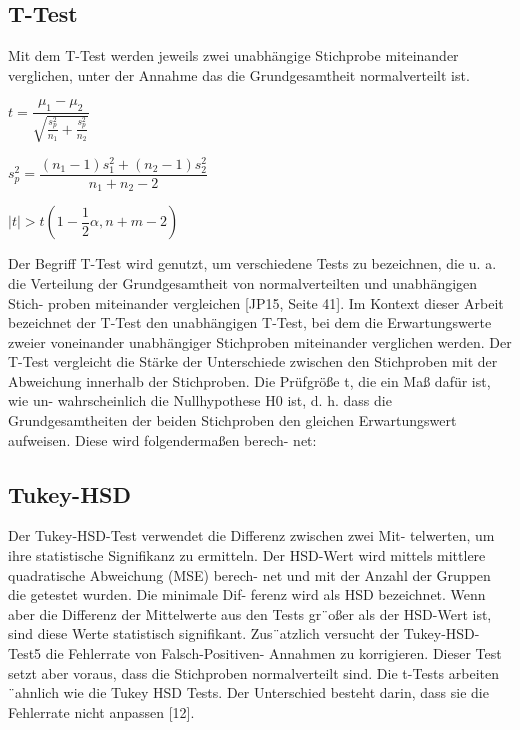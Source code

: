 \subsection{T-Test}
Mit dem T-Test werden jeweils zwei unabhängige Stichprobe miteinander verglichen, 
unter der Annahme das die Grundgesamtheit normalverteilt ist.

\begin{center}
  $t = \dfrac{\mu_1-\mu_2}{\sqrt{\frac{s_p^2}{n_1} + \frac{s_p^2}{n_2}}}$
\end{center}

\begin{center}
  $s^2_p = \dfrac{(n_1 - 1)s^2_1 + (n_2 - 1)s^2_2}{n_1 + n_2 - 2}$
\end{center}

\begin{center}
  $|t| > t(1 - \dfrac{1}{2}\alpha, n + m - 2)$
\end{center}

Der Begriff T-Test wird genutzt, um verschiedene Tests zu bezeichnen, die
u. a. die Verteilung der Grundgesamtheit von normalverteilten und unabhängigen Stich-
proben miteinander vergleichen [JP15, Seite 41]. Im Kontext dieser Arbeit bezeichnet
der T-Test den unabhängigen T-Test, bei dem die Erwartungswerte zweier voneinander
unabhängiger Stichproben miteinander verglichen werden.
Der T-Test vergleicht die Stärke der Unterschiede zwischen den Stichproben mit der
Abweichung innerhalb der Stichproben. Die Prüfgröße t, die ein Maß dafür ist, wie un-
wahrscheinlich die Nullhypothese H0 ist, d. h. dass die Grundgesamtheiten der beiden
Stichproben den gleichen Erwartungswert aufweisen. Diese wird folgendermaßen berech-
net:
\subsection{Tukey-HSD}
Der Tukey-HSD-Test verwendet die Differenz zwischen zwei Mit-
telwerten, um ihre statistische Signifikanz zu ermitteln.
Der HSD-Wert wird mittels mittlere quadratische Abweichung (MSE) berech-
net und mit der Anzahl der Gruppen die getestet wurden. Die minimale Dif-
ferenz wird als HSD bezeichnet. Wenn aber die Differenz der Mittelwerte aus
den Tests gr¨oßer als der HSD-Wert ist, sind diese Werte statistisch signifikant.
Zus¨atzlich versucht der Tukey-HSD-Test5 die Fehlerrate von Falsch-Positiven-
Annahmen zu korrigieren. Dieser Test setzt aber voraus, dass die Stichproben
normalverteilt sind. Die t-Tests arbeiten ¨ahnlich wie die Tukey HSD Tests. Der
Unterschied besteht darin, dass sie die Fehlerrate nicht anpassen [12]. 

